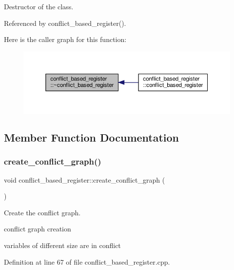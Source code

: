 Destructor of the class. 



Referenced by conflict\+\_\+based\+\_\+register().

Here is the caller graph for this function\+:
\nopagebreak
\begin{figure}[H]
\begin{center}
\leavevmode
\includegraphics[width=350pt]{da/db2/classconflict__based__register_a27c2512b494cf700ad195e96291c8cc7_icgraph}
\end{center}
\end{figure}


\subsection{Member Function Documentation}
\mbox{\label{classconflict__based__register_af30a10c52d9bda402b67284972e9d2a4}} 
\subsubsection{\texorpdfstring{create\+\_\+conflict\+\_\+graph()}{create\_conflict\_graph()}}
{\footnotesize\ttfamily void conflict\+\_\+based\+\_\+register\+::create\+\_\+conflict\+\_\+graph (\begin{DoxyParamCaption}{ }\end{DoxyParamCaption})}



Create the conflict graph. 

conflict graph creation

variables of different size are in conflict 

Definition at line 67 of file conflict\+\_\+based\+\_\+register.\+cpp.



